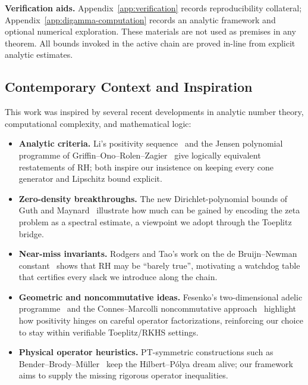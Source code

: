 \noindent\textbf{Verification aids.} Appendix~\ref{app:verification} records reproducibility collateral; Appendix~\ref{app:digamma-computation} records an analytic framework and optional numerical exploration. These materials are not used as premises in any theorem. All bounds invoked in the active chain are proved in-line from explicit analytic estimates.

\subsection{Contemporary Context and Inspiration}

This work was inspired by several recent developments in analytic number theory, computational complexity, and mathematical logic:

\begin{itemize}
  \item \textbf{Analytic criteria.} Li's positivity sequence~\cite{Li1997} and the Jensen polynomial programme of Griffin--Ono--Rolen--Zagier~\cite{GriffinOnoRolenZagier2019} give logically equivalent restatements of RH; both inspire our insistence on keeping every cone generator and Lipschitz bound explicit.

  \item \textbf{Zero-density breakthroughs.} The new Dirichlet-polynomial bounds of Guth and Maynard~\cite{GuthMaynard2024} illustrate how much can be gained by encoding the zeta problem as a spectral estimate, a viewpoint we adopt through the Toeplitz bridge.

  \item \textbf{Near-miss invariants.} Rodgers and Tao's work on the de Bruijn--Newman constant~\cite{rodgers2020debruijn} shows that RH may be ``barely true'', motivating a watchdog table that certifies every slack we introduce along the chain.

  \item \textbf{Geometric and noncommutative ideas.} Fesenko's two-dimensional adelic programme~\cite{Fesenko2008} and the Connes--Marcolli noncommutative approach~\cite{ConnesMarcolli2008} highlight how positivity hinges on careful operator factorizations, reinforcing our choice to stay within verifiable Toeplitz/RKHS settings.

  \item \textbf{Physical operator heuristics.} PT-symmetric constructions such as Bender--Brody--M\"uller~\cite{BenderBrodyMuller2017} keep the Hilbert--P\'olya dream alive; our framework aims to supply the missing rigorous operator inequalities.


\end{itemize}
